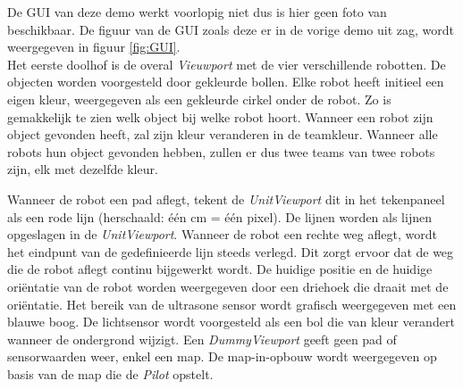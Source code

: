 \documentclass[tt2]{penoverslag}
\begin{document}
De GUI van deze demo werkt voorlopig niet dus is hier geen foto van beschikbaar. De figuur van de GUI zoals deze er in de vorige demo uit zag, wordt weergegeven in figuur \ref{fig:GUI}.\\

Het eerste doolhof is de overal \textit{Vieuwport} met de vier verschillende robotten.  De objecten worden voorgesteld door gekleurde bollen. Elke robot heeft initieel een eigen kleur, weergegeven als een gekleurde cirkel onder de robot. Zo is gemakkelijk te zien welk object bij welke robot hoort. Wanneer een robot zijn object gevonden heeft, zal zijn kleur veranderen in de teamkleur. Wanneer alle robots hun object gevonden hebben, zullen er dus twee teams van twee robots zijn, elk met dezelfde kleur.



Wanneer de robot een pad aflegt, tekent de \textit{UnitViewport} dit in het tekenpaneel als een rode lijn (herschaald: \'e\'en cm = \'e\'en pixel). De lijnen worden als lijnen opgeslagen in de \textit{UnitViewport}. Wanneer de robot een rechte weg aflegt, wordt het eindpunt van de gedefinieerde lijn steeds verlegd. Dit zorgt ervoor dat de weg die de robot aflegt continu bijgewerkt wordt. De huidige positie en de huidige ori\"entatie van de robot worden weergegeven door een driehoek die draait met de ori\"entatie. Het bereik van de ultrasone sensor wordt grafisch weergegeven met een blauwe boog. De lichtsensor wordt voorgesteld als een bol die van kleur verandert wanneer de ondergrond wijzigt. 
Een \textit{DummyViewport} geeft geen pad of sensorwaarden weer, enkel een map. De map-in-opbouw wordt weergegeven op basis van de map die de \textit{Pilot} opstelt.\\
\end{document}
